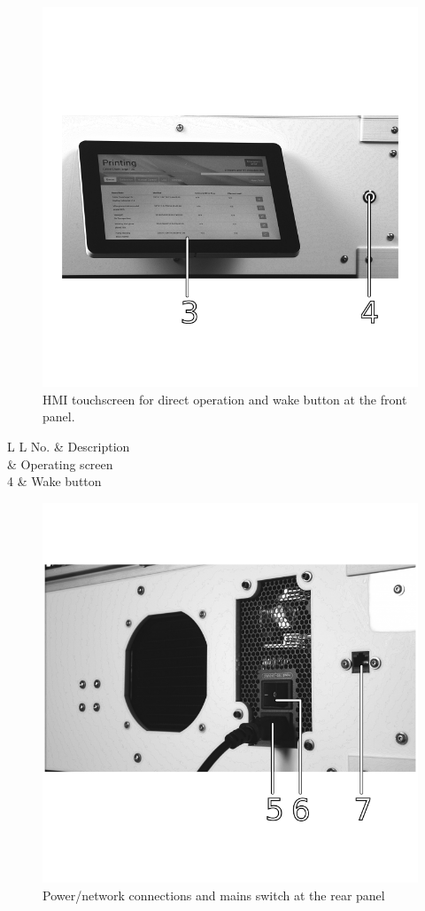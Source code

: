 \begin{figure}[H]
  \centering
  \includegraphics[width=.7\linewidth]{./img/qsg_overview_2.png}
  \caption{HMI touchscreen for direct operation and wake button at the front panel.}
\end{figure}


\begin{table}[H]
  \centering
  \begin{tabulary}{\textwidth}{ L L }
    \toprule
    No. 	&   Description  \\
     	    &   Operating screen \\
    4 	    &   Wake button  \\
    \bottomrule
  \end{tabulary}
\end{table}


\begin{figure}[H]
  \centering
  \includegraphics[width=.7\linewidth]{./img/qsg_overview_3.png}
  \caption{Power/network connections and mains switch at the rear panel}
\end{figure}

